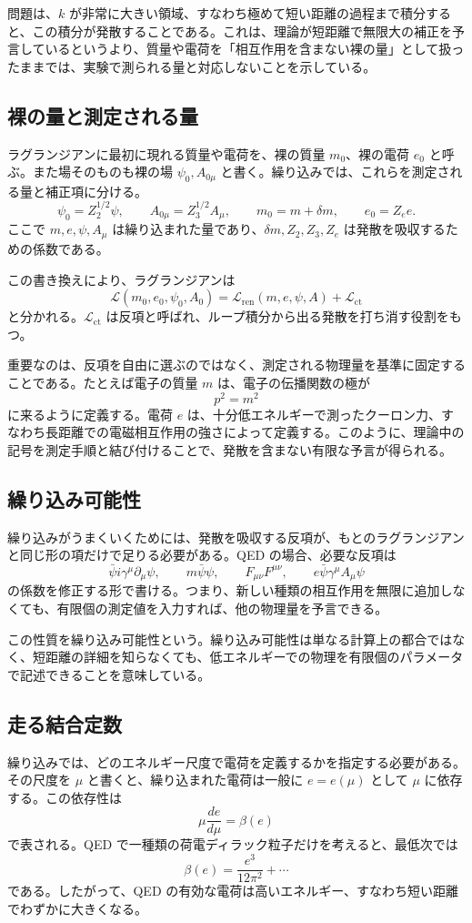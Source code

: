 問題は、$k$ が非常に大きい領域、すなわち極めて短い距離の過程まで積分すると、この積分が発散することである。これは、理論が短距離で無限大の補正を予言しているというより、質量や電荷を「相互作用を含まない裸の量」として扱ったままでは、実験で測られる量と対応しないことを示している。

\subsection{裸の量と測定される量}
ラグランジアンに最初に現れる質量や電荷を、裸の質量 $m_0$、裸の電荷 $e_0$ と呼ぶ。また場そのものも裸の場 $\psi_0,A_{0\mu}$ と書く。繰り込みでは、これらを測定される量と補正項に分ける。
\[
\psi_0=Z_2^{1/2}\psi,
\qquad
A_{0\mu}=Z_3^{1/2}A_\mu,
\qquad
m_0=m+\delta m,
\qquad
e_0=Z_e e.
\]
ここで $m,e,\psi,A_\mu$ は繰り込まれた量であり、$\delta m,Z_2,Z_3,Z_e$ は発散を吸収するための係数である。

この書き換えにより、ラグランジアンは
\[
\mathcal{L}(m_0,e_0,\psi_0,A_0)
=
\mathcal{L}_{\mathrm{ren}}(m,e,\psi,A)
+\mathcal{L}_{\mathrm{ct}}
\]
と分かれる。$\mathcal{L}_{\mathrm{ct}}$ は反項と呼ばれ、ループ積分から出る発散を打ち消す役割をもつ。

重要なのは、反項を自由に選ぶのではなく、測定される物理量を基準に固定することである。たとえば電子の質量 $m$ は、電子の伝播関数の極が
\[
p^2=m^2
\]
に来るように定義する。電荷 $e$ は、十分低エネルギーで測ったクーロン力、すなわち長距離での電磁相互作用の強さによって定義する。このように、理論中の記号を測定手順と結び付けることで、発散を含まない有限な予言が得られる。

\subsection{繰り込み可能性}
繰り込みがうまくいくためには、発散を吸収する反項が、もとのラグランジアンと同じ形の項だけで足りる必要がある。QED の場合、必要な反項は
\[
\bar{\psi}i\gamma^\mu\partial_\mu\psi,
\qquad
m\bar{\psi}\psi,
\qquad
F_{\mu\nu}F^{\mu\nu},
\qquad
e\bar{\psi}\gamma^\mu A_\mu\psi
\]
の係数を修正する形で書ける。つまり、新しい種類の相互作用を無限に追加しなくても、有限個の測定値を入力すれば、他の物理量を予言できる。

この性質を繰り込み可能性という。繰り込み可能性は単なる計算上の都合ではなく、短距離の詳細を知らなくても、低エネルギーでの物理を有限個のパラメータで記述できることを意味している。

\subsection{走る結合定数}
繰り込みでは、どのエネルギー尺度で電荷を定義するかを指定する必要がある。その尺度を $\mu$ と書くと、繰り込まれた電荷は一般に $e=e(\mu)$ として $\mu$ に依存する。この依存性は
\[
\mu\frac{de}{d\mu}=\beta(e)
\]
で表される。QED で一種類の荷電ディラック粒子だけを考えると、最低次では
\[
\beta(e)=\frac{e^3}{12\pi^2}+\cdots
\]
である。したがって、QED の有効な電荷は高いエネルギー、すなわち短い距離でわずかに大きくなる。

